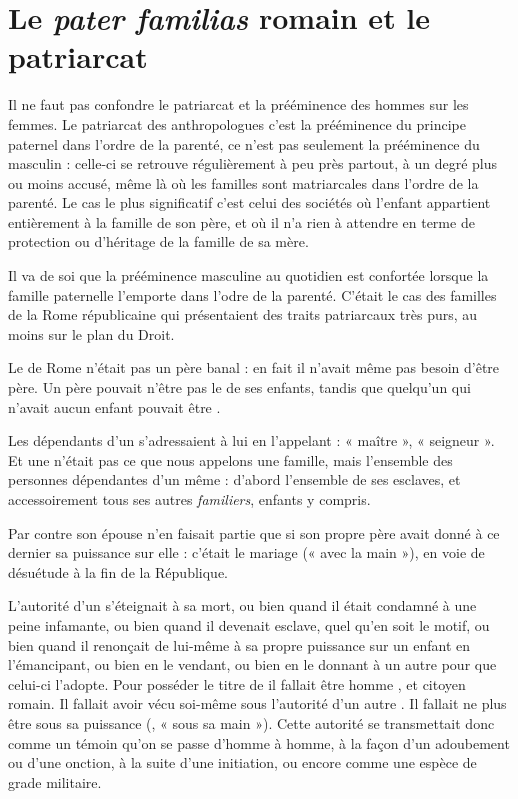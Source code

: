\section{Le \emph{pater familias} romain et le patriarcat}

Il ne faut pas confondre le patriarcat et la prééminence des hommes
sur les femmes. Le patriarcat des anthropologues c'est la prééminence du principe paternel
dans l'ordre de la parenté, ce n'est pas seulement la prééminence du masculin : celle-ci
se retrouve régulièrement à peu près partout, à un degré plus ou moins accusé, même là où les familles sont matriarcales dans l'ordre de la parenté. 
Le cas le plus significatif c'est celui des sociétés où l'enfant appartient
entièrement à la famille de son père, et où il n'a rien à attendre en
terme de protection ou d'héritage de la famille de sa mère. 

Il va de soi que la prééminence masculine au quotidien est confortée lorsque la famille paternelle l'emporte dans l'odre de la parenté.
C'était le cas des familles de la Rome républicaine qui présentaient
des traits patriarcaux très purs, au moins sur le plan du Droit.

Le  de Rome n'était pas un père banal : en fait il n'avait
même pas besoin d'être père. Un père pouvait n'être pas le 
de ses enfants, tandis que quelqu'un qui n'avait aucun enfant pouvait être
.

Les dépendants d'un  s'adressaient à lui en l'appelant
 : « maître », « seigneur ». Et une  n'était pas ce que nous
appelons une famille, mais l'ensemble des personnes dépendantes d'un même
 : d'abord l'ensemble de ses esclaves, et accessoirement tous ses
autres \emph{familiers}, enfants y compris.

Par contre son épouse n'en faisait partie que si son propre père
avait donné à ce dernier sa puissance sur elle : c'était le mariage 
(« avec la main »), en voie de désuétude à la fin de la République.

L'autorité d'un  s'éteignait à sa mort, ou bien quand il
était condamné à une peine infamante, ou bien quand il devenait esclave,
quel qu'en soit le motif, ou bien quand il renonçait de lui-même à sa
propre puissance sur un enfant en l'émancipant, ou bien en le vendant,
ou bien en le donnant à un autre  pour que celui-ci l'adopte.
Pour posséder le titre de  il fallait être homme , et citoyen
romain. Il fallait avoir vécu soi-même sous l'autorité d'un autre .
Il fallait ne plus être sous sa puissance (, « sous sa main »).
Cette autorité se transmettait donc comme un témoin qu'on se passe
d'homme à homme, à la façon d'un adoubement ou d'une onction, à la
suite d'une initiation, ou encore comme une espèce de grade militaire.


